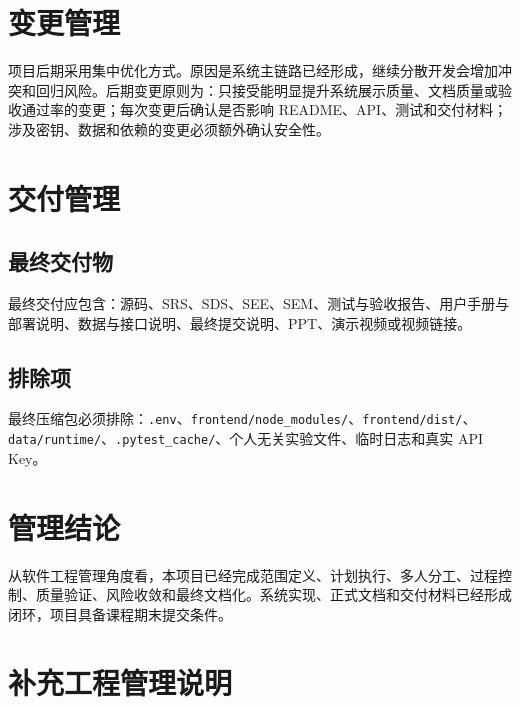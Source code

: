 \documentclass[12pt,a4paper]{ctexart}
\newcommand{\code}[1]{{\footnotesize\nolinkurl{#1}}}
\begin{document}
\section{变更管理}
项目后期采用集中优化方式。原因是系统主链路已经形成，继续分散开发会增加冲突和回归风险。后期变更原则为：只接受能明显提升系统展示质量、文档质量或验收通过率的变更；每次变更后确认是否影响 README、API、测试和交付材料；涉及密钥、数据和依赖的变更必须额外确认安全性。

\section{交付管理}
\subsection{最终交付物}
最终交付应包含：源码、SRS、SDS、SEE、SEM、测试与验收报告、用户手册与部署说明、数据与接口说明、最终提交说明、PPT、演示视频或视频链接。

\subsection{排除项}
最终压缩包必须排除：\code{.env}、\code{frontend/node_modules/}、\code{frontend/dist/}、\code{data/runtime/}、\code{.pytest_cache/}、个人无关实验文件、临时日志和真实 API Key。

\section{管理结论}
从软件工程管理角度看，本项目已经完成范围定义、计划执行、多人分工、过程控制、质量验证、风险收敛和最终文档化。系统实现、正式文档和交付材料已经形成闭环，项目具备课程期末提交条件。

\clearpage
\section{补充工程管理说明}
\end{document}
